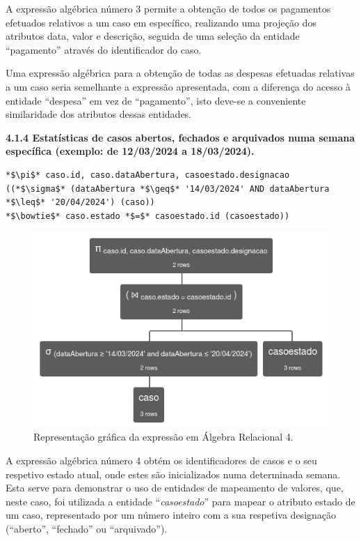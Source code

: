 \documentclass[a4paper,12pt]{scrreprt}
\begin{document}
A expressão algébrica número 3 permite a obtenção de todos os pagamentos efetuados relativos a um caso em específico, realizando uma projeção dos atributos data, valor e descrição, seguida de uma seleção da entidade “pagamento” através do identificador do caso.

Uma expressão algébrica para a obtenção de todas as despesas efetuadas relativas a um caso seria semelhante a expressão apresentada, com a diferença do acesso à entidade “despesa” em vez de “pagamento”, isto deve-se a conveniente similaridade dos atributos dessas entidades. 

\clearpage %
{\large\textbf{4.1.4 Estatísticas de casos abertos, fechados e arquivados numa semana específica (exemplo: de 12/03/2024 a 18/03/2024).}}

\vspace{0.2cm}
\begin{lstlisting}[escapechar=*]
*$\pi$* caso.id, caso.dataAbertura, casoestado.designacao
((*$\sigma$* (dataAbertura *$\geq$* '14/03/2024' AND dataAbertura *$\leq$* '20/04/2024') (caso))
*$\bowtie$* caso.estado *$=$* casoestado.id (casoestado))
\end{lstlisting}

\begin{figure}[!ht]
    \centering
    \includegraphics[scale=0.77]{images/relax/4.png}
    \caption{Representação gráfica da expressão em Álgebra Relacional 4.}
\end{figure}
\vspace{0.2cm}

A expressão algébrica número 4 obtém os identificadores de casos e o seu respetivo estado atual, onde estes são inicializados numa determinada semana. Esta serve para demonstrar o uso de entidades de mapeamento de valores, que, neste caso, foi utilizada a entidade “\textit{casoestado}” para mapear o atributo estado de um caso, representado por um número inteiro com a sua respetiva designação (“aberto”, “fechado” ou “arquivado”).
\end{document}
